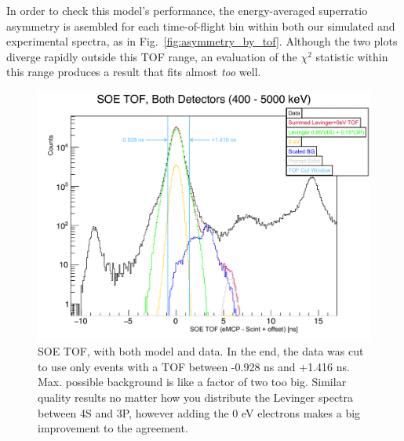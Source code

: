 In order to check this model's performance, the energy-averaged superratio asymmetry is asembled for each time-of-flight bin within both our simulated and experimental spectra, as in Fig.~\ref{fig:asymmetry_by_tof}.  Although the two plots diverge rapidly outside this TOF range, an evaluation of the $\chi^2$ statistic within this range produces a result that fits almost \emph{too} well.  


\begin{figure}[h!tb]
	\centering
	\includegraphics[width=.999\linewidth]
	{Figures/SOE_TOF_Spectra.pdf}
	\caption[SOE TOF -- Model and Data]{SOE TOF, with both model and data.  In the end, the data was cut to use only events with a TOF between -0.928 ns and +1.416 ns.  Max. possible background is like a factor of two too big.  Similar quality results no matter how you distribute the Levinger spectra between 4S and 3P, however adding the 0 eV electrons makes a big improvement to the agreement. }	
	\label{fig:soetof}
\end{figure}

